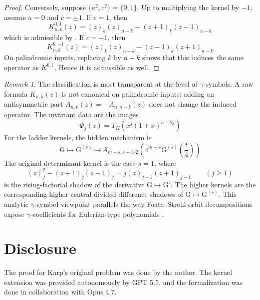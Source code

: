 \documentclass[a4paper,11pt,reqno]{amsart}
\numberwithin{equation}{section}
\theoremstyle{remark}
\newtheorem{remark}{Remark}
\newcommand{\Gpoly}{\mathrm{G}}     %
\begin{document}
\begin{proof}
Conversely, suppose \(\{a^2,c^2\}=\{0,1\}\). Up to multiplying the kernel by \(-1\), assume \(a=0\) and \(c=\pm1\). If \(c=1\), then
\[
  K_{n,k}^{0,1}(z)
  =
  (z)_k(z)_{n-k}-(z+1)_k(z-1)_{n-k}
\]
which is admissible by . If \(c=-1\), then
\[
  K_{n,k}^{0,-1}(z)
  =
  (z)_k(z)_{n-k}-(z-1)_k(z+1)_{n-k}
\]
On palindromic inputs, replacing \(k\) by \(n-k\) shows that this induces the same operator as \(K^{0,1}\). Hence it is admissible as well.
\end{proof}

\begin{remark}
The classification is most transparent at the level of \(\gamma\)-symbols. A raw formula \(K_{n,k}(z)\) is not canonical on palindromic inputs: adding an antisymmetric part \(A_{n,k}(z)=-A_{n,n-k}(z)\) does not change the induced operator. The invariant data are the images
\[
  \Phi_j(z)=
  T_K\left(x^j(1+x)^{n-2j}\right)
\]
For the ladder kernels, the hidden mechanism is
\[
  \Gpoly
  \longmapsto
  \Gpoly^{(s)}
  \longmapsto
  \mathcal S_{m-s,s+1/2}
  \left(
    4^{m-s}\Gpoly^{(s)}\left(\frac t4\right)
  \right)
\]
The original determinant kernel is the case \(s=1\), where
\[
  (z)_j^2-(z+1)_j(z-1)_j
  =
  j(z)_{j-1}(z+1)_{j-1}
  \qquad (j\geq1)
\]
is the rising-factorial shadow of the derivative \(\Gpoly\mapsto\Gpoly'\). The higher kernels are the corresponding higher central divided-difference shadows of \(\Gpoly\mapsto\Gpoly^{(s)}\). This analytic \(\gamma\)-symbol viewpoint parallels the way Foata--Strehl orbit decompositions expose \(\gamma\)-coefficients for Eulerian-type polynomials \cite{FoataStrehl1974,FoataStrehl1976,Branden2008}.
\end{remark}

\section*{Disclosure}

The proof for Karp's original problem was done by the author. The kernel extension was provided autonomously by GPT 5.5, and the formalization was done in collaboration with Opus 4.7.
\end{document}
